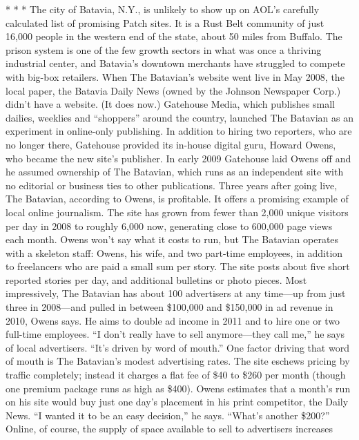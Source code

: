 * * *
The city of Batavia, N.Y., is unlikely to show up on AOL’s carefully calculated
list of promising Patch sites. It is a Rust Belt community of just 16,000 people in
the western end of the state, about 50 miles from Buffalo. The prison system is
one of the few growth sectors in what was once a thriving industrial center, and
Batavia’s downtown merchants have struggled to compete with big-box retailers.
When The Batavian’s website went live in May 2008, the local paper, the
Batavia Daily News (owned by the Johnson Newspaper Corp.) didn’t have a
website. (It does now.) Gatehouse Media, which publishes small dailies, weeklies
and ``shoppers'' around the country, launched The Batavian as an experiment in
online-only publishing. In addition to hiring two reporters, who are no longer
there, Gatehouse provided its in-house digital guru, Howard Owens, who became
the new site’s publisher. In early 2009 Gatehouse laid Owens off and he
assumed ownership of The Batavian, which runs as an independent site with no
editorial or business ties to other publications.
Three years after going live, The Batavian, according to Owens, is profitable. It
offers a promising example of local online journalism. The site has grown from
fewer than 2,000 unique visitors per day in 2008 to roughly 6,000 now, generating
close to 600,000 page views each month. Owens won’t say what it costs to
run, but The Batavian operates with a skeleton staff: Owens, his wife, and two
part-time employees, in addition to freelancers who are paid a small sum per
story. The site posts about five short reported stories per day, and additional bulletins
or photo pieces.
Most impressively, The Batavian has about 100 advertisers at any time—up
from just three in 2008—and pulled in between \$100,000 and \$150,000 in ad
revenue in 2010, Owens says. He aims to double ad income in 2011 and to hire
one or two full-time employees. ``I don’t really have to sell anymore—they call
me,'' he says of local advertisers. ``It’s driven by word of mouth.''
One factor driving that word of mouth is The Batavian’s modest advertising
rates. The site eschews pricing by traffic completely; instead it charges a flat fee
of \$40 to \$260 per month (though one premium package runs as high as \$400).
Owens estimates that a month’s run on his site would buy just one day’s placement
in his print competitor, the Daily News. ``I wanted it to be an easy decision,''
he says. ``What’s another \$200?''
Online, of course, the supply of space available to sell to advertisers increases
